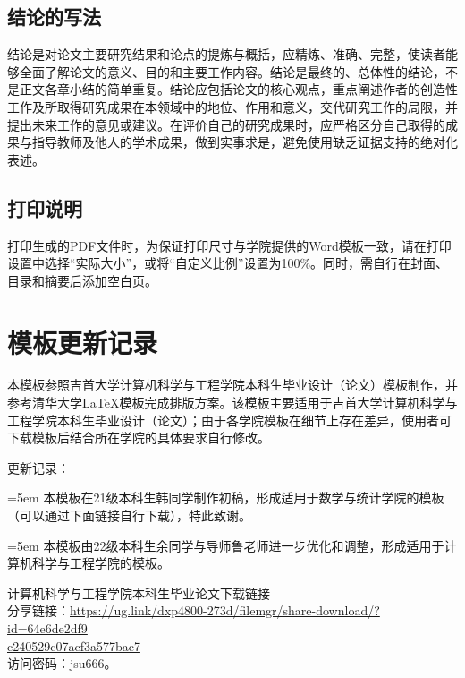 \documentclass[12pt, a4paper, fontset=fandol]{ctexart}
\numberwithin{equation}{section}
\begin{document}
\subsection{结论的写法}

结论是对论文主要研究结果和论点的提炼与概括，应精炼、准确、完整，使读者能够全面了解论文的意义、目的和主要工作内容。结论是最终的、总体性的结论，不是正文各章小结的简单重复。结论应包括论文的核心观点，重点阐述作者的创造性工作及所取得研究成果在本领域中的地位、作用和意义，交代研究工作的局限，并提出未来工作的意见或建议。在评价自己的研究成果时，应严格区分自己取得的成果与指导教师及他人的学术成果，做到实事求是，避免使用缺乏证据支持的绝对化表述。

\subsection{打印说明}

打印生成的PDF文件时，为保证打印尺寸与学院提供的Word模板一致，请在打印设置中选择“实际大小”，或将“自定义比例”设置为100\%。同时，需自行在封面、目录和摘要后添加空白页。


\section{模板更新记录}
本模板参照吉首大学计算机科学与工程学院本科生毕业设计（论文）模板制作，并参考清华大学LaTeX{}模板完成排版方案。该模板主要适用于吉首大学计算机科学与工程学院本科生毕业设计（论文）；由于各学院模板在细节上存在差异，使用者可下载模板后结合所在学院的具体要求自行修改。

\vspace{\baselineskip}
\noindent 更新记录：

\noindent{}\hangindent=5em
本模板在21级本科生韩同学制作初稿，形成适用于数学与统计学院的模板（可以通过下面链接自行下载），特此致谢。

\noindent{}\hangindent=5em
本模板由22级本科生余同学与导师鲁老师进一步优化和调整，形成适用于计算机科学与工程学院的模板。

\vspace{\baselineskip}
\noindent 计算机科学与工程学院本科生毕业论文下载链接\\
\noindent 分享链接：\href{https://ug.link/dxp4800-273d/filemgr/share-download/?id=64e6de2df9c240529c07acf3a577bac7}{{\engfont https://ug.link/dxp4800-273d/filemgr/share-download/?id=64e6de2df9}}\\
\noindent \href{https://ug.link/dxp4800-273d/filemgr/share-download/?id=64e6de2df9c240529c07acf3a577bac7}{{\engfont c240529c07acf3a577bac7}}\\
\noindent 访问密码：{\engfont jsu666}。
\end{document}
